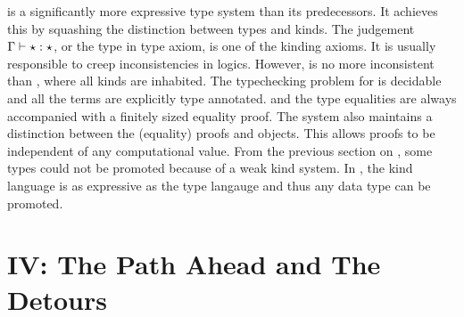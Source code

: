 \documentclass[screen,nonacm,manuscript,review]{acmart} %
\begin{document}
\SFK is a significantly more expressive type system than its predecessors. It achieves this by squashing
the distinction between types and kinds. The judgement $\Gamma \vdash \star : \star$,
or the type in type axiom, is one of the kinding axioms.
It is usually responsible to creep inconsistencies in logics.
However, \SFK is no more inconsistent than \SFC, where all kinds are inhabited.
The typechecking problem for \SFK is decidable and all the terms are explicitly type annotated.
and the type equalities are always accompanied with a finitely sized equality proof.
The system also maintains a distinction between the (equality)
proofs and objects. This allows proofs to be independent of any computational value.
From the previous section on \SFP, some types could not be
promoted because of a weak kind system. In \SFK, the kind language is as expressive
as the type langauge and thus any data type can be promoted.

\part{IV: The Path Ahead and The Detours}\label{part:IV}
\end{document}
